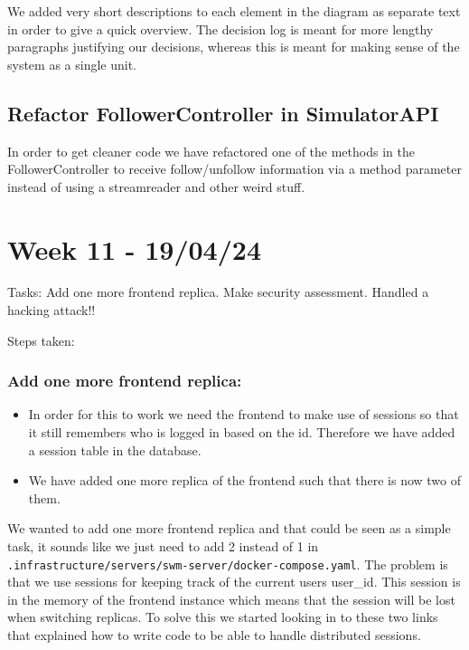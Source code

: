 We added very short descriptions to each element in the diagram as separate text in order to give a quick overview. The decision log is meant for more lengthy paragraphs justifying our decisions, whereas this is meant for making sense of the system as a single unit.

\subsection{Refactor FollowerController in SimulatorAPI}
\label{log:refactor-followercontroller-in-simulatorapi}

In order to get cleaner code we have refactored one of the methods in the FollowerController to receive follow/unfollow information via a method parameter instead of using a streamreader and other weird stuff.

\section{Week 11 - 19/04/24}
\label{log:week11}

Tasks: Add one more frontend replica. Make security assessment. Handled
a hacking attack!!

Steps taken:

\subsubsection{Add one more frontend replica:}
\label{log:add-one-more-frontend-replica}

\begin{itemize}
    \item In order for this to work we need the frontend to make use of sessions so that it still remembers who is logged in based on the id. Therefore we have added a session table in the database.
    \item We have added one more replica of the frontend such that there is now two of them.
\end{itemize}

We wanted to add one more frontend replica and that could be seen as a simple task, it sounds like we just need to add 2 instead of 1 in \texttt{.infrastructure/servers/swm-server/docker-compose.yaml}. The problem is that we use sessions for keeping track of the current users user\_id. This session is in the memory of the frontend instance which means that the session will be lost when switching replicas. To solve this we started looking in to these two links that explained how to write code to be able to handle distributed sessions.

